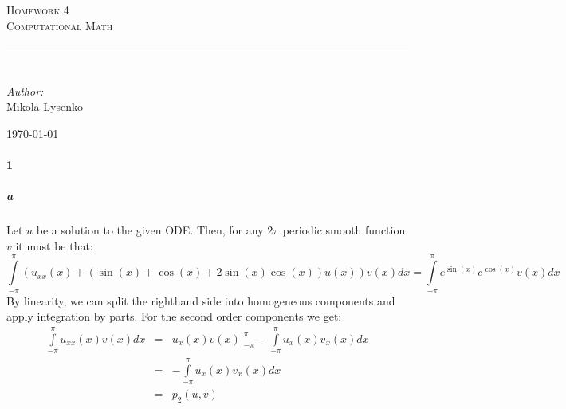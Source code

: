 \documentclass{article}
\newcommand{\HRule}{\rule{\linewidth}{0.5mm}}
\begin{document}

\begin{titlepage}
 
\begin{center}
 
\textsc{\LARGE Homework 4}\\[1.5cm] 

\textsc{\Large Computational Math}\\[0.5cm]
 
 
\HRule \\[2cm]
 
\begin{minipage}{0.4\textwidth}
\begin{flushleft} \large
\emph{Author:}\\
Mikola Lysenko
\end{flushleft}
\end{minipage}
 
\vfill
 
{\large \today}
 
\end{center}
 
\end{titlepage}


\paragraph{1}

\subparagraph{a}
Let $u$ be a solution to the given ODE.  Then, for any $2\pi$ periodic smooth function $v$ it must be that:
\[ \int \limits_{-\pi}^{\pi} (u_{xx}(x) + \left( \sin(x) + \cos(x) + 2 \sin(x) \cos(x) \right) u(x)) v(x) dx = \int \limits_{-\pi}^{\pi} e^{\sin(x)} e^{\cos(x)} v(x) dx \]
By linearity, we can split the righthand side into homogeneous components and apply integration by parts.  For the second order components we get:
\begin{eqnarray*}
\int \limits_{-\pi}^{\pi} u_{xx}(x) v(x) dx & = & u_{x}(x)v(x) |_{-\pi}^{\pi} - \int \limits_{-\pi}^{\pi} u_{x}(x) v_x(x) dx \\
& = & -\int \limits_{-\pi}^{\pi} u_x(x) v_x(x) dx \\
& = & p_2(u, v)
\end{eqnarray*}
\end{document}
